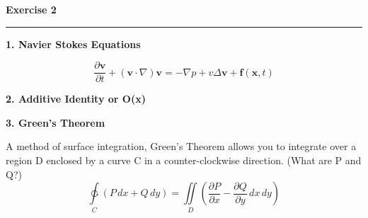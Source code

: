 \documentclass{article}
\begin{document}
\newpage
\noindent \textbf{Exercise 2}

\noindent \rule{\textwidth}{.1mm}

\begin{center}
\textbf{1. Navier Stokes Equations}
\end{center}

\begin{equation*}
\frac{\partial \mathbf{v}}{\partial t} + \left( \mathbf{v} \cdot \nabla \right) \mathbf{v} =  - \nabla p + v \Delta \mathbf{v} + \mathbf{f}\left( \mathbf{x}, t\right)
\end{equation*}

\begin{center}
\textbf{2. Additive Identity or O(x)}
\end{center}

\begin{center}
\textbf{3. Green's Theorem}
\end{center}

A method of surface integration, Green's Theorem allows you to integrate over a region D enclosed by a curve C in a counter-clockwise direction. (What are P and Q?)
\begin{equation*}
\ointctrclockwise\limits_C \left( P \, dx + Q \, dy \right) = \iint\limits_D \left( \frac{\partial P}{\partial x} - \frac{\partial Q}{\partial y} \, dx \, dy \right)
\end{equation*}
\end{document}
